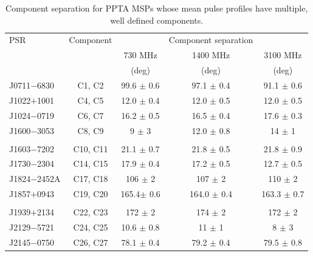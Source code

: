 \documentclass[useAMS,usenatbib]{mn2e}
\begin{document}
\begin{table}
\begin{center}
\caption{Component separation for PPTA MSPs whose mean pulse profiles have multiple, well defined components.}
\label{separation}
\begin{tabular}{lcccc}
\hline
PSR              & Component        &         & Component separation &      \\
								 &                  & 730 MHz & 1400 MHz             & 3100 MHz \\
								 &                  &  (deg)  & (deg)                &   (deg)  \\
\hline
J0711$-$6830     &  C1, C2          &99.6  $\pm$ 0.6  & 97.1  $\pm$ 0.4 & 91.1 $\pm$ 0.6  \\
J1022$+$1001     &  C4, C5          &12.0  $\pm$ 0.4  & 12.0  $\pm$ 0.5 & 12.0 $\pm$ 0.5  \\
J1024$-$0719     &  C6, C7          &16.2  $\pm$ 0.5  & 16.5  $\pm$ 0.4 & 17.6 $\pm$ 0.3  \\
J1600$-$3053     &  C8, C9          & 9    $\pm$ 3    & 12.0  $\pm$ 0.8 &  14  $\pm$ 1    \\
	               &                  &                 &                 &                 \\
J1603$-$7202     &  C10, C11        &21.1  $\pm$ 0.7  & 21.8  $\pm$ 0.5 & 21.8 $\pm$ 0.9  \\
J1730$-$2304     &  C14, C15        &17.9  $\pm$ 0.4  & 17.2  $\pm$ 0.5 & 12.7 $\pm$ 0.5  \\
J1824$-$2452A    &  C17, C18        &  106 $\pm$ 2    &  107  $\pm$ 2   & 110  $\pm$ 2    \\
J1857$+$0943     &  C19, C20        & 165.4$\pm$ 0.6  & 164.0 $\pm$ 0.4 &163.3 $\pm$ 0.7  \\
	               &                  &                 &                 &                 \\
J1939$+$2134     &  C22, C23        & 172  $\pm$ 2    & 174   $\pm$ 2   &  172 $\pm$ 2    \\
J2129$-$5721     &  C24, C25        & 10.6 $\pm$ 0.8  &   11  $\pm$ 1   &   8  $\pm$ 3    \\
J2145$-$0750     &  C26, C27        & 78.1 $\pm$ 0.4  & 79.2  $\pm$ 0.4 &79.5  $\pm$ 0.8  \\ 
\hline
\end{tabular}
\end{center}
\end{table}
\end{document}
